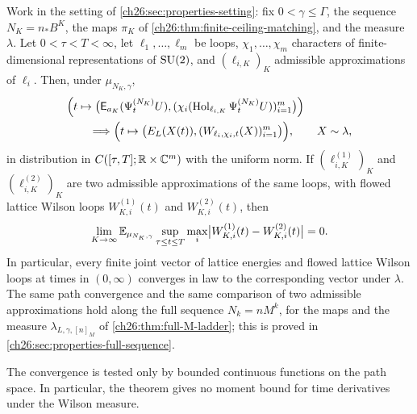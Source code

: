 \begin{theorem}\label{ch26:thm:actual-observable-paths}
Work in the setting of \cref{ch26:sec:properties-setting}: fix $0<\gamma\le\Gamma$, the sequence $N_K=n_*B^K$, the maps $\pi_K$ of \cref{ch26:thm:finite-ceiling-matching}, and the measure $\lambda$. Let $0<\tau<T<\infty$, let $\ell_1,\dots,\ell_m$ be loops, $\chi_1,\dots,\chi_m$ characters of finite-dimensional representations of $\mathrm{SU}(2)$, and $(\ell_{i,K})_K$ admissible approximations of $\ell_i$. Then, under $\mu_{N_K,\gamma}$,
\[
 \begin{aligned}
 &\Bigl(t\mapsto\bigl(\mathsf E_{a_K}(\Psi^{(N_K)}_tU),(\chi_i(\operatorname{Hol}_{\ell_{i,K}}\Psi^{(N_K)}_tU))_{i=1}^m\bigr)\Bigr)\\
 &\qquad\Longrightarrow
 \Bigl(t\mapsto\bigl(E_L(X(t)),(W_{\ell_i,\chi_i,t}(X))_{i=1}^m\bigr)\Bigr),\qquad X\sim\lambda,
 \end{aligned}
\]
in distribution in $C([\tau,T];\mathbb R\times\mathbb C^m)$ with the uniform norm. If $(\ell^{(1)}_{i,K})_K$ and $(\ell^{(2)}_{i,K})_K$ are two admissible approximations of the same loops, with flowed lattice Wilson loops $W^{(1)}_{K,i}(t)$ and $W^{(2)}_{K,i}(t)$, then
\[
 \lim_{K\to\infty}\mathbb E_{\mu_{N_K,\gamma}}\sup_{\tau\le t\le T}\max_i\bigl\lvert W^{(1)}_{K,i}(t)-W^{(2)}_{K,i}(t)\bigr\rvert=0.
\]
In particular, every finite joint vector of lattice energies and flowed lattice Wilson loops at times in $(0,\infty)$ converges in law to the corresponding vector under $\lambda$. The same path convergence and the same comparison of two admissible approximations hold along the full sequence $N_k=nM^k$, for the maps and the measure $\lambda_{L,\gamma,[n]_M}$ of \cref{ch26:thm:full-M-ladder}; this is proved in \cref{ch26:sec:properties-full-sequence}.
\end{theorem}

The convergence is tested only by bounded continuous functions on the path space. In particular, the theorem gives no moment bound for time derivatives under the Wilson measure.

